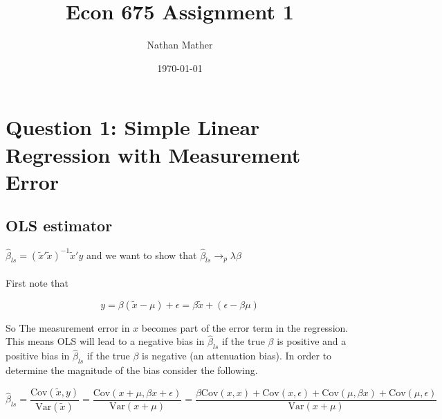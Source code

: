 \documentclass[11pt]{article}
\title{Econ 675 Assignment 1} %
\author{Nathan Mather} %
\date{\today} %
\newcommand{\Var}{\mathrm{Var}}
\newcommand{\Cov}{\mathrm{Cov}}
\begin{document}
	
\maketitle %

\setcounter{tocdepth}{2} %

\tableofcontents %

\listoffigures %

\listoftables %
	

\section{Question 1: Simple Linear Regression with Measurement Error}
\subsection{OLS estimator}
$\hat{\beta}_{ls} = (\tilde{x}'\tilde{x})^{-1}\tilde{x}'y$ and we want to show that $\hat{\beta}_{ls} 	\rightarrow_{p} \lambda\beta$
\\
\\
First note that
 
\begin{displaymath}
y=\beta(\tilde{x}-\mu)+\epsilon = \beta\tilde{x} + (\epsilon-\beta\mu)
\end{displaymath}

So The measurement error in $x$ becomes part of the error term in the regression. This means OLS will lead to a negative bias in $\hat{\beta}_{ls}$ if the true $\beta$ is positive and a positive bias in $\hat{\beta}_{ls}$ if the true $\beta$ is negative (an attenuation bias). In order to determine the magnitude of the bias consider the following. 

$$\hat{\beta}_{ls} = \frac{\mathrm{Cov}(\tilde{x},y)}{\mathrm{Var}(\tilde{x})}  
 = \frac{\mathrm{Cov}(x + \mu, \beta x + \epsilon )}{\mathrm{Var}(x + \mu)} 
 = \frac{\beta \Cov(x,x) + \Cov(x,\epsilon) + \Cov(\mu, \beta x) + \Cov(\mu, \epsilon)}{\Var(x + \mu)}$$
 
\end{document}
